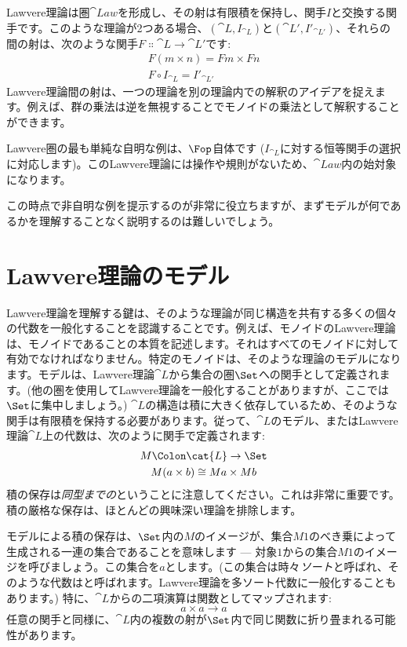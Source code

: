 Lawvere理論は圏$\cat{Law}$を形成し、その射は有限積を保持し、関手$I$と交換する関手です。このような理論が2つある場合、$(\cat{L}, I_{\cat{L}})$と$(\cat{L'}, I'_{\cat{L'}})$、それらの間の射は、次のような関手$F \Colon \cat{L} \to \cat{L'}$です: 
\begin{gather*}
  F (m \times n) = F m \times F n \\
  F \circ I_{\cat{L}} = I'_{\cat{L'}}
\end{gather*}
Lawvere理論間の射は、一つの理論を別の理論内での解釈のアイデアを捉えます。例えば、群の乗法は逆を無視することでモノイドの乗法として解釈することができます。

Lawvere圏の最も単純な自明な例は、$\Fop$自体です ($I_{\cat{L}}$に対する恒等関手の選択に対応します)。このLawvere理論には操作や規則がないため、$\cat{Law}$内の始対象になります。

この時点で非自明な例を提示するのが非常に役立ちますが、まずモデルが何であるかを理解することなく説明するのは難しいでしょう。

\section{Lawvere理論のモデル}

Lawvere理論を理解する鍵は、そのような理論が同じ構造を共有する多くの個々の代数を一般化することを認識することです。例えば、モノイドのLawvere理論は、モノイドであることの本質を記述します。それはすべてのモノイドに対して有効でなければなりません。特定のモノイドは、そのような理論のモデルになります。モデルは、Lawvere理論$\cat{L}$から集合の圏$\Set$への関手として定義されます。(他の圏を使用してLawvere理論を一般化することがありますが、ここでは$\Set$に集中しましょう。) $\cat{L}$の構造は積に大きく依存しているため、そのような関手は有限積を保持する必要があります。従って、$\cat{L}$のモデル、またはLawvere理論$\cat{L}$上の代数は、次のように関手で定義されます: 
\begin{gather*}
  M \Colon \cat{L} \to \Set \\
  M (a \times b) \cong M a \times M b
\end{gather*}
積の保存は\emph{同型までの}ということに注意してください。これは非常に重要です。積の厳格な保存は、ほとんどの興味深い理論を排除します。

モデルによる積の保存は、$\Set$内の$M$のイメージが、集合$M 1$のべき乗によって生成される一連の集合であることを意味します --- 対象$1$からの集合$M 1$のイメージを呼びましょう。この集合を$a$とします。(この集合は時々\emph{ソート}と呼ばれ、そのような代数はと呼ばれます。Lawvere理論を多ソート代数に一般化することもあります。) 特に、$\cat{L}$からの二項演算は関数としてマップされます: 
\[a \times a \to a\]
任意の関手と同様に、$\cat{L}$内の複数の射が$\Set$内で同じ関数に折り畳まれる可能性があります。

